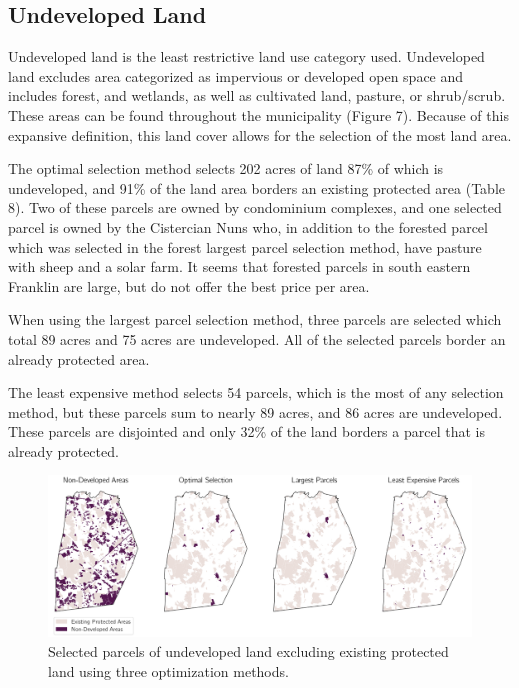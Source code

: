\documentclass[12pt, stu, floatsintext,table]{apa7}
\begin{document}
\subsection{Undeveloped Land}
Undeveloped land is the least restrictive land use category used. Undeveloped land excludes area categorized as impervious or developed open space and includes forest, and wetlands, as well as cultivated land, pasture, or shrub/scrub. These areas can be found throughout the municipality (Figure 7). Because of this expansive definition, this land cover allows for the selection of the most land area. 

The optimal selection method selects 202 acres of land 87\% of which is undeveloped, and 91\% of the land area borders an existing protected area (Table 8). Two of these parcels are owned by condominium complexes, and one selected parcel is owned by the Cistercian Nuns who, in addition to the forested parcel which was selected in the forest largest parcel selection method, have pasture with sheep and a solar farm. It seems that forested parcels in south eastern Franklin are large, but do not offer the best price per area.  

When using the largest parcel selection method, three parcels are selected which total 89 acres and 75 acres are undeveloped. All of the selected parcels border an already protected area. 


 The least expensive method selects 54 parcels, which is the most of any selection method, but these parcels sum to nearly 89 acres, and 86 acres are undeveloped. These parcels are disjointed and only 32\% of the land borders a parcel that is already protected. 
\begin{figure}[hbtp]
    \centering
    \includegraphics[width = \textwidth]{figures/n_61ndev.png}
    \caption{Selected parcels of undeveloped land excluding existing protected land using three optimization methods. }
\end{figure}
\end{document}
